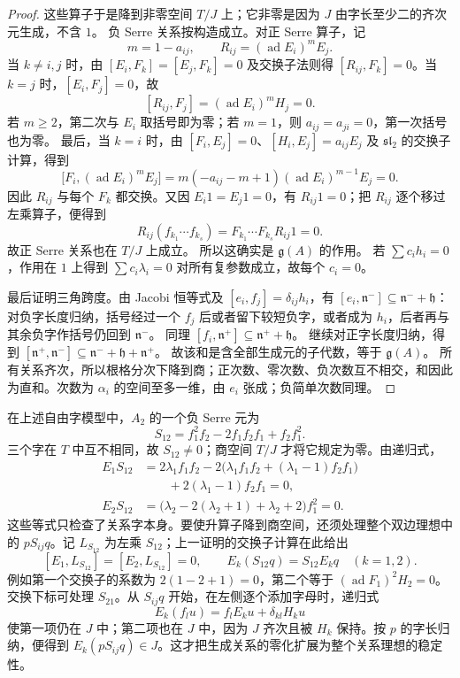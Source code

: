 \begin{proof}
	这些算子于是降到非零空间 \(T/J\) 上；它非零是因为 \(J\) 由字长至少二的齐次元生成，不含 \(1\)。 负 Serre 关系按构造成立。对正 Serre 算子，记
	\[
		m=1-a_{ij},\qquad R_{ij}=(\operatorname{ad}E_i)^mE_j.
	\]
	当 \(k\ne i,j\) 时，由 \([E_i,F_k]=[E_j,F_k]=0\) 及交换子法则得 \([R_{ij},F_k]=0\)。当 \(k=j\) 时，\([E_i,F_j]=0\)，故
	\[
		[R_{ij},F_j]=(\operatorname{ad}E_i)^mH_j=0.
	\]
	若 \(m\ge2\)，第二次与 \(E_i\) 取括号即为零；若 \(m=1\)，则 \(a_{ij}=a_{ji}=0\)，第一次括号也为零。 最后，当 \(k=i\) 时，由 \([F_i,E_j]=0\)、\([H_i,E_j]=a_{ij}E_j\) 及 \(\mathfrak{sl}_2\) 的交换子计算，得到
	\[
		\bigl[F_i,(\operatorname{ad}E_i)^mE_j\bigr] =m(-a_{ij}-m+1)(\operatorname{ad}E_i)^{m-1}E_j=0.
	\]
	因此 \(R_{ij}\) 与每个 \(F_k\) 都交换。又因 \(E_i1=E_j1=0\)，有 \(R_{ij}1=0\)；把 \(R_{ij}\) 逐个移过左乘算子，便得到
	\[
		R_{ij}(f_{k_1}\cdots f_{k_s}) =F_{k_1}\cdots F_{k_s}R_{ij}1=0.
	\]
	故正 Serre 关系也在 \(T/J\) 上成立。 所以这确实是 \(\mathfrak g(A)\) 的作用。 若 \(\sum c_i h_i=0\)，作用在 \(1\) 上得到 \(\sum c_i\lambda_i=0\) 对所有复参数成立，故每个 \(c_i=0\)。

	最后证明三角跨度。由 Jacobi 恒等式及 \([e_i,f_j]=\delta_{ij}h_i\)，有 \([e_i,\mathfrak n^-]\subseteq\mathfrak n^-+\mathfrak h\)： 对负字长度归纳，括号经过一个 \(f_j\) 后或者留下较短负字，或者成为 \(h_i\)，后者再与其余负字作括号仍回到 \(\mathfrak n^-\)。 同理 \([f_i,\mathfrak n^+]\subseteq\mathfrak n^++\mathfrak h\)。 继续对正字长度归纳，得到 \([\mathfrak n^+,\mathfrak n^-]\subseteq \mathfrak n^-+\mathfrak h+\mathfrak n^+\)。 故该和是含全部生成元的子代数，等于 \(\mathfrak g(A)\)。 所有关系齐次，所以根格分次下降到商；正次数、零次数、负次数互不相交，和因此为直和。次数为 \(\alpha_i\) 的空间至多一维，由 \(e_i\) 张成；负简单次数同理。
\end{proof}

在上述自由字模型中，\(A_2\) 的一个负 Serre 元为
\[
	S_{12}=f_1^2f_2-2f_1f_2f_1+f_2f_1^2.
\]
三个字在 \(T\) 中互不相同，故 \(S_{12}\ne0\)；商空间 \(T/J\) 才将它规定为零。由递归式，
\[
	\begin{aligned}
		E_1S_{12} &=2\lambda_1f_1f_2 -2\bigl(\lambda_1f_1f_2+(\lambda_1-1)f_2f_1\bigr)\\
		&\qquad+2(\lambda_1-1)f_2f_1=0,\\
		E_2S_{12} &=\bigl(\lambda_2-2(\lambda_2+1)+\lambda_2+2\bigr)f_1^2=0.
	\end{aligned}
\]
这些等式只检查了关系字本身。要使升算子降到商空间，还须处理整个双边理想中的 \(pS_{ij}q\)。记 \(L_{S_{12}}\) 为左乘 \(S_{12}\)；上一证明的交换子计算在此给出
\[
	[E_1,L_{S_{12}}]=[E_2,L_{S_{12}}]=0, \qquad E_k(S_{12}q)=S_{12}E_kq\quad(k=1,2).
\]
例如第一个交换子的系数为 \(2(1-2+1)=0\)，第二个等于 \((\operatorname{ad}F_1)^2H_2=0\)。交换下标可处理 \(S_{21}\)。从 \(S_{ij}q\) 开始，在左侧逐个添加字母时，递归式
\[
	E_k(f_lu)=f_lE_ku+\delta_{kl}H_ku
\]
使第一项仍在 \(J\) 中；第二项也在 \(J\) 中，因为 \(J\) 齐次且被 \(H_k\) 保持。按 \(p\) 的字长归纳，便得到 \(E_k(pS_{ij}q)\in J\)。这才把生成关系的零化扩展为整个关系理想的稳定性。

